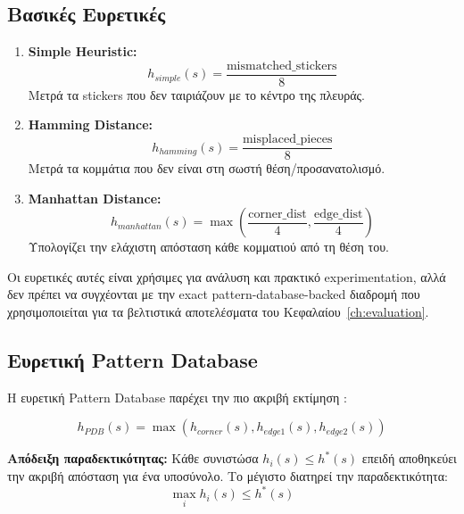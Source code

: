 \subsection{Βασικές Ευρετικές}

\begin{enumerate}
    \item \textbf{Simple Heuristic:}
    \begin{equation}
    h_{simple}(s) = \frac{\text{mismatched\_stickers}}{8}
    \end{equation}
    Μετρά τα stickers που δεν ταιριάζουν με το κέντρο της πλευράς.

    \item \textbf{Hamming Distance:}
    \begin{equation}
    h_{hamming}(s) = \frac{\text{misplaced\_pieces}}{8}
    \end{equation}
    Μετρά τα κομμάτια που δεν είναι στη σωστή θέση/προσανατολισμό.

    \item \textbf{Manhattan Distance:}
    \begin{equation}
    h_{manhattan}(s) = \max\left(\frac{\text{corner\_dist}}{4}, \frac{\text{edge\_dist}}{4}\right)
    \end{equation}
    Υπολογίζει την ελάχιστη απόσταση κάθε κομματιού από τη θέση του.
\end{enumerate}

Οι ευρετικές αυτές είναι χρήσιμες για ανάλυση και πρακτικό experimentation,
αλλά δεν πρέπει να συγχέονται με την exact pattern-database-backed διαδρομή που
χρησιμοποιείται για τα βελτιστικά αποτελέσματα του Κεφαλαίου~\ref{ch:evaluation}.

\subsection{Ευρετική Pattern Database}

Η ευρετική Pattern Database παρέχει την πιο ακριβή εκτίμηση \cite{korf1997finding}:

\begin{equation}
h_{PDB}(s) = \max(h_{corner}(s), h_{edge1}(s), h_{edge2}(s))
\label{eq:pdb_heuristic}
\end{equation}

\textbf{Απόδειξη παραδεκτικότητας:} Κάθε συνιστώσα $h_i(s) \leq h^*(s)$ επειδή αποθηκεύει την ακριβή απόσταση για ένα υποσύνολο. Το μέγιστο διατηρεί την παραδεκτικότητα:
\begin{equation}
\max_i h_i(s) \leq h^*(s)
\end{equation}

